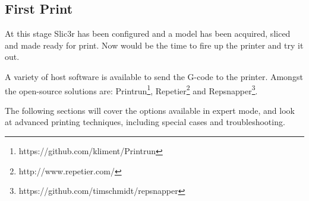 
\subsection{First Print} %
\label{sec:first_print}

At this stage Slic3r has been configured and a model has been acquired, sliced and made ready for print.  Now would be the time to fire up the printer and try it out.

A variety of host software is available to send the G-code to the printer.  Amongst the open-source solutions are: Printrun\footnote{https://github.com/kliment/Printrun}, Repetier\footnote{http://www.repetier.com/} and Repsnapper\footnote{https://github.com/timschmidt/repsnapper}.

The following sections will cover the options available in expert mode, and look at advanced printing techniques, including special cases and troubleshooting.

